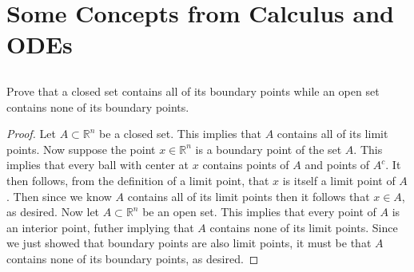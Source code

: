 \documentclass[11pt]{article}
\begin{document}
\pagestyle{fancy}
\fancyhead{}
\tableofcontents
\fancyhead[L]{\leftmark}
\fancyhead[C]{}
\fancyhead[R]{\rightmark}
\newpage
\section{Some Concepts from Calculus and ODEs}
\subsection{}
Prove that a closed set contains all of its boundary points while an open set contains none of its boundary points.
\begin{proof}
Let $A \subset \mathbb{R}^n$ be a closed set. This implies that $A$ contains all
of its limit points. Now suppose the point $x \in \mathbb{R}^n$ is a boundary
point of the set $A$. This implies that every ball with center at $x$ contains
points
of $A$ and points of $A^c$. It then follows, from the definition of a limit point,
that $x$ is itself a limit point of $A$. Then since we know $A$ contains all
of its limit points then it follows that $x \in A$, as desired. \newline
\indent Now let $A \subset \mathbb{R}^n$ be an open set. This implies that every
point of $A$ is an interior point, futher implying that $A$ contains none of its
limit points. Since we just showed that boundary points are also limit points,
it must be that $A$ contains none of its boundary points, as desired.
\end{proof}
\end{document}
